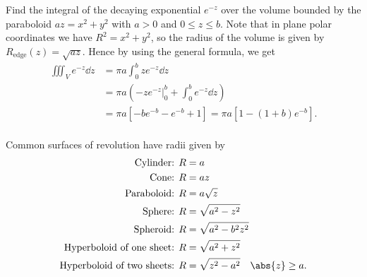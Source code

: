 \documentclass[../multivariate_calculus.tex]{subfiles}
\begin{document}
        \begin{example}
            Find the integral of the decaying exponential $e^{-z}$ over the volume bounded by the paraboloid $az=x^2+y^2$ with $a>0$ and $0\leq z\leq b$.
            Note that in plane polar coordinates we have $R^2=x^2+y^2$, so the radius of the volume is given by $R_\text{edge}(z)=\sqrt{az}$.
            Hence by using the general formula, we get
            \begin{align}
                \iiint_V e^{-z}\dd{z}&=\pi a\int_0^b ze^{-z}\dd{z}\\
                &=\pi a\left(\left.-ze^{-z}\right|_0^b+\int_0^b e^{-z}\dd{z}\right)\\
                &=\pi a\left[-be^{-b}-e^{-b}+1\right]=\pi a[1-(1+b)e^{-b}].
            \end{align}
        \end{example}
        
        \paragraph{}
        Common surfaces of revolution have radii given by
        \begin{align}
            \text{Cylinder: }&R=a\\
            \text{Cone: }&R=az\\
            \text{Paraboloid: }&R=a\sqrt{z}\\
            \text{Sphere: }&R=\sqrt{a^2-z^2}\\
            \text{Spheroid: }&R=\sqrt{a^2-b^2z^2}\\
            \text{Hyperboloid of one sheet: }&R=\sqrt{a^2+z^2}\\
            \text{Hyperboloid of two sheets: }&R=\sqrt{z^2-a^2}\quad\abs{z}\geq a.
        \end{align}
\end{document}

